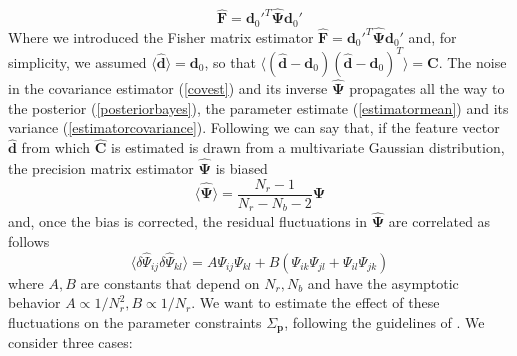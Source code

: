 \documentclass[reprint,aps,prd,superscriptaddress,showkeys,showpacs]{revtex4-1}
\newcommand{\bb}[1]{\mathbf{#1}}
\newcommand{\bbh}[1]{\mathbf{\hat{#1}}}
\newcommand{\h}[1]{\hat{#1}}
\begin{document}
\begin{equation}
\label{estimatorfisher}
\bbh{F} = \bb{d}_0'^T\bbh{\Psi}\bb{d}_0'
\end{equation}
%
Where we introduced the Fisher matrix estimator $\bbh{F} = \bb{d}_0'^T\bbh{\Psi}\bb{d}_0'$ and, for simplicity, we assumed $\langle\bbh{d}\rangle=\bb{d}_0$, so that $\langle(\bbh{d}-\bb{d}_0)(\bbh{d}-\bb{d}_0)^T\rangle=\bb{C}$. 
The noise in the covariance estimator (\ref{covest}) and its inverse $\bbh{\Psi}$ propagates all the way to the posterior (\ref{posteriorbayes}), the parameter estimate (\ref{estimatormean}) and its variance (\ref{estimatorcovariance}). Following \citep{Taylor12} we can say that, if the feature vector $\bbh{d}$ from which $\bbh{C}$ is estimated is drawn from a multivariate Gaussian distribution, the precision matrix estimator $\bbh{\Psi}$ is biased
\begin{equation}
\label{psibias}
\langle\bbh{\Psi}\rangle = \frac{N_r-1}{N_r-N_b-2}\bb{\Psi}
\end{equation}
%
and, once the bias is corrected, the residual fluctuations in $\bbh{\Psi}$ are correlated as follows
\begin{equation}
\label{psifluctuations}
\langle\delta\h{\Psi}_{ij}\delta\h{\Psi}_{kl}\rangle = A\Psi_{ij}\Psi_{kl} + B(\Psi_{ik}\Psi_{jl} + \Psi_{il}\Psi_{jk})
\end{equation}
%
where $A,B$ are constants that depend on $N_r,N_b$ and have the asymptotic behavior $A\propto1/N_r^2,B\propto1/N_r$. We want to estimate the effect of these fluctuations on the parameter constraints $\Sigma_\bb{p}$, following the guidelines of \citep{DodelsonSchneider13}. We consider three cases:
\end{document}
